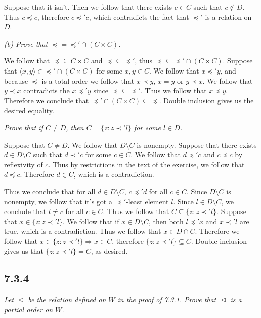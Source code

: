 \documentclass[11pt,oneside,titlepage]{book}
\DeclareMathOperator \ra {\Rightarrow}
\newcommand{\eangle}[1]{\langle #1 \rangle}
\newcommand{\set}[1]{\{ #1 \}}
\begin{document}
Suppose that it isn't. Then we follow that there exists $c \in C$ such that $c \notin D$. Thus
$c \preceq c$, therefore $c \preceq' c$, which contradicts the fact that $\preceq'$ is
a relation on $D$.

\textit{(b) Prove that $\preceq = \preceq' \cap (C \times C)$.}

We follow that $\preceq \subseteq C \times C$ and $\preceq \subseteq \preceq'$, thus
$\preceq \subseteq \preceq' \cap (C \times C)$. Suppose that $\eangle{x, y} \in
\preceq' \cap (C \times C)$ for some $x, y \in C$. We follow that
$x \preceq' y$, and because $\preceq$ is a total order we follow that
$x \prec y$, $x = y$ or $y \prec x$. We follow that $y \prec x$ contradicts the
$x \preceq' y$ since $\preceq \subseteq \preceq'$. Thus we follow that
$x \preceq y$. Therefore we conclude that
$\preceq' \cap (C \times C) \subseteq \preceq$. Double inclusion gives us the desired equality.

\textit{Prove that if $C \neq D$, then $C = \set{z: z \prec' l}$ for some $l \in D$.}

Suppose that $C \neq D$. We follow that $D \setminus C$ is nonempty. Suppose
that there exists $d \in D \setminus C$ such that $d \prec' c$ for some $c \in C$.
We follow that $d \preceq' c$ and $c \preceq c$ by reflexivity of $c$. Thus by restrictions
in the text of the exercise, we follow that $d \preceq c$. Therefore $d \in C$, which is a
contradiction.

Thus we conclude that for all $d \in D \setminus C$, $c \preceq' d$ for all $c \in C$.
Since $D \setminus C$ is nonempty, we follow that it's got a $\preceq'$-least element $l$.
Since $l \in D \setminus C$, we conclude that $l \neq c$ for all $c \in C$.
Thus we follow that $C \subseteq \set{z: z \prec' l}$. Suppose that
$x \in \set{z: z \prec' l}$. We follow that if $x \in D \setminus C$, then both $l \preceq' x$
and $x \prec' l$ are true, which is a contradiction. Thus we follow that $x \in D \cap C$.
Therefore we  follow that $x \in \set{z: z \prec' l} \ra x \in C$, therefore
$\set{z: z \prec' l} \subseteq C$. Double inclusion gives us that
$\set{z: z \prec' l} = C$, as desired.


\subsection*{7.3.4}

\textit{Let $\trianglelefteq$ be the relation defined on $W$ in the proof of 7.3.1. Prove that
  $\trianglelefteq$ is a partial order on $W$.}
\end{document}
